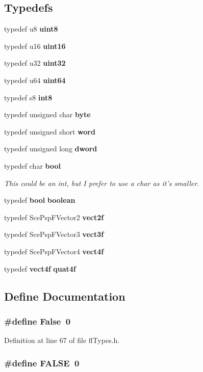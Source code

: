 \subsection*{Typedefs}
\begin{CompactItemize}
\item 
typedef u8 {\bf uint8}
\item 
typedef u16 {\bf uint16}
\item 
typedef u32 {\bf uint32}
\item 
typedef u64 {\bf uint64}
\item 
typedef s8 {\bf int8}
\item 
typedef unsigned char {\bf byte}
\item 
typedef unsigned short {\bf word}
\item 
typedef unsigned long {\bf dword}
\item 
typedef char {\bf bool}
\begin{CompactList}\small\item\em This could be an int, but I prefer to use a char as it's smaller. \item\end{CompactList}\item 
typedef {\bf bool} {\bf boolean}
\item 
typedef Sce\-Psp\-FVector2 {\bf vect2f}
\item 
typedef Sce\-Psp\-FVector3 {\bf vect3f}
\item 
typedef Sce\-Psp\-FVector4 {\bf vect4f}
\item 
typedef {\bf vect4f} {\bf quat4f}
\end{CompactItemize}


\subsection{Define Documentation}
\subsubsection{\setlength{\rightskip}{0pt plus 5cm}\#define False~0}\label{flTypes_8h_306ebd41c0cd1303b1372c6153f0caf8}




Definition at line 67 of file fl\-Types.h.
\subsubsection{\setlength{\rightskip}{0pt plus 5cm}\#define FALSE~0}\label{flTypes_8h_a93f0eb578d23995850d61f7d61c55c1}




